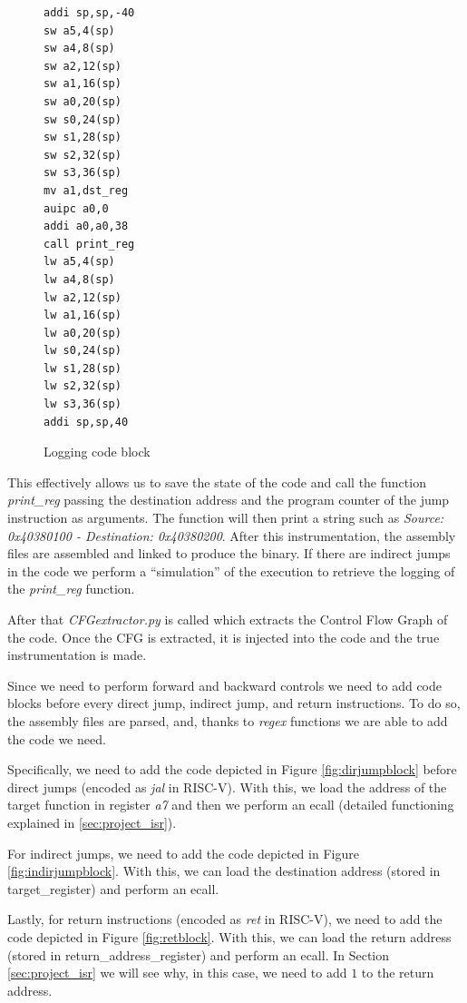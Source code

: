 \begin{figure}
  \setlength{\intextsep}{0pt}
  \begin{minipage}{0.25\textwidth}
    \begin{lstlisting}[style=Assembly]
addi sp,sp,-40
sw a5,4(sp)
sw a4,8(sp)
sw a2,12(sp)
sw a1,16(sp)
sw a0,20(sp)
sw s0,24(sp)
sw s1,28(sp)
sw s2,32(sp)
sw s3,36(sp)
mv a1,dst_reg
auipc a0,0
addi a0,a0,38
call print_reg
lw a5,4(sp)
lw a4,8(sp)
lw a2,12(sp)
lw a1,16(sp)
lw a0,20(sp)
lw s0,24(sp)
lw s1,28(sp)
lw s2,32(sp)
lw s3,36(sp)
addi sp,sp,40
\end{lstlisting}
  \end{minipage}
  \caption{Logging code block}
  \label{fig:loggingblock}
\end{figure}

This effectively allows us to save the state of the code and call the function
\textit{print\_reg} passing the destination address and the program counter of the
jump instruction as arguments. The function will then print a string such as
\textit{Source: 0x40380100 - Destination: 0x40380200}. After this
instrumentation, the assembly files are assembled and linked to produce the binary.
If there are indirect jumps in the code we perform a ``simulation'' of the
execution to retrieve the logging of the \textit{print\_reg} function.

After that \textit{CFGextractor.py} is called which extracts the Control Flow
Graph of the code. Once the CFG is extracted, it is injected into the code and
the true instrumentation is made.

Since we need to perform forward and backward controls we need to add code
blocks before every direct jump, indirect jump, and return instructions. To do so,
the assembly files are parsed, and, thanks to \textit{regex} functions we are able
to add the code we need.

Specifically, we need to add the code depicted in Figure \ref{fig:dirjumpblock}
before direct jumps (encoded as \textit{jal} in RISC-V). With this, we load the address
of the target function in register \textit{a7} and then we perform an ecall (detailed
functioning explained in \ref{sec:project_isr}).

For indirect jumps, we need to add the code depicted in Figure \ref{fig:indirjumpblock}.
With this, we can load the destination address (stored in target\_register) and perform
an ecall.

Lastly, for return instructions (encoded as \textit{ret} in RISC-V), we need to
add the code depicted in Figure \ref{fig:retblock}. With this, we can load the
return address (stored in return\_address\_register) and perform an ecall. In Section
\ref{sec:project_isr} we will see why, in this case, we need to add $1$ to the return
address.

